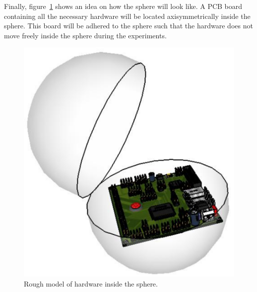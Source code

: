 Finally, figure~\ref{fig:sphere} shows an idea on how the sphere will look like.  A PCB board containing all the necessary hardware will be located axisymmetrically inside the sphere.  This board will be adhered to the sphere such that the hardware does not move freely inside the sphere during the experiments.

\begin{figure}[H]
	\centering
	\includegraphics[scale=0.6]{img/Sphere_001}
	\caption{Rough model of hardware inside the sphere. \label{fig:sphere}}
\end{figure}
